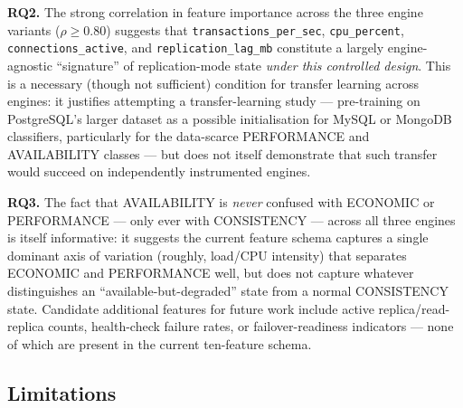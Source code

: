 \documentclass[iicol,pdflatex,sn-mathphys-num]{sn-jnl}
\theoremstyle{thmstyleone}
\theoremstyle{thmstylethree}
\begin{document}
\textbf{RQ2.} The strong correlation in feature importance across the
three engine variants ($\rho \geq 0.80$) suggests that
\texttt{transactions\_per\_sec}, \texttt{cpu\_percent},
\texttt{connections\_active}, and \texttt{replication\_lag\_mb}
constitute a largely engine-agnostic ``signature'' of replication-mode
state \emph{under this controlled design}. This is a necessary (though
not sufficient) condition for transfer learning across engines: it
justifies attempting a transfer-learning study --- pre-training on
PostgreSQL's larger dataset as a possible initialisation for MySQL or
MongoDB classifiers, particularly for the data-scarce PERFORMANCE and
AVAILABILITY classes --- but does not itself demonstrate that such
transfer would succeed on independently instrumented engines.

\textbf{RQ3.} The fact that AVAILABILITY is \emph{never} confused with
ECONOMIC or PERFORMANCE --- only ever with CONSISTENCY --- across all
three engines is itself informative: it suggests the current feature
schema captures a single dominant axis of variation (roughly,
load/CPU intensity) that separates ECONOMIC and PERFORMANCE well, but
does not capture whatever distinguishes an ``available-but-degraded''
state from a normal CONSISTENCY state. Candidate additional features
for future work include active replica/read-replica counts, health-check
failure rates, or failover-readiness indicators --- none of which are
present in the current ten-feature schema.

\subsection{Limitations}\label{subsec:limitations}
\end{document}
